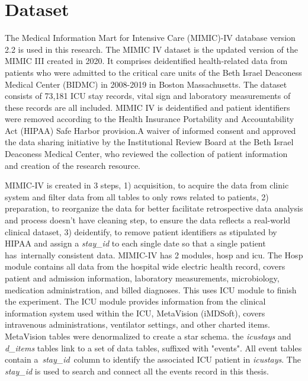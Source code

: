 \documentclass[12pt,a4paper,english
]{tunithesis}
\begin{document}
\section{Dataset}
The Medical Information Mart for Intensive Care (MIMIC)-IV database version 2.2 is used in this research. \parencite{johnson2023} The MIMIC IV dataset is the updated version of the MIMIC III created in 2020. It comprises deidentified health-related data from patients who were admitted to the critical care units of the Beth Israel Deaconess Medical Center (BIDMC) in 2008-2019 in Boston Massachusetts. The dataset consists of 73,181 ICU stay records, vital sign and laboratory measurements of these records are all included. MIMIC IV is deidentified and patient identifiers were removed according to the Health Insurance Portability and Accountability Act (HIPAA) Safe Harbor provision.A waiver of informed consent and approved the data sharing initiative by the Institutional Review Board at the Beth Israel Deaconess Medical Center, who reviewed the collection of patient information and creation of the research resource. \parencite{johnson2023}

MIMIC-IV is created in 3 steps, 1) acquisition, to acquire the data from clinic system and filter data from all tables to only rows related to patients, 2) preparation, to reorganize the data for better facilitate retrospective data analysis and process doesn't have cleaning step, to ensure the data reflects a real-world clinical dataset, 3) deidentify, to remove patient identifiers as stipulated by HIPAA and assign a \textit{stay\_id} to each single date so that a single patient has internally consistent data. MIMIC-IV has 2 modules, hosp and icu. The Hosp module contains all data from the hospital wide electric health record, covers patient and admission information, laboratory measurements, microbiology, medication administration, and billed diagnoses. This uses ICU module to finish the experiment. The ICU module provides information from the clinical information system used within the ICU, MetaVision (iMDSoft), covers intravenous administrations, ventilator settings, and other charted items. MetaVision tables were denormalized to create a star schema. the \textit{icustays} and \textit{d\_items} tables link to a set of data tables,  suffixed with "events". All event tables contain a \textit{stay\_id} column to identify the associated ICU patient in \textit{icustays}. The \textit{stay\_id} is used to search and connect all the events record in this thesis. \parencite{johnson2023}
\end{document}
